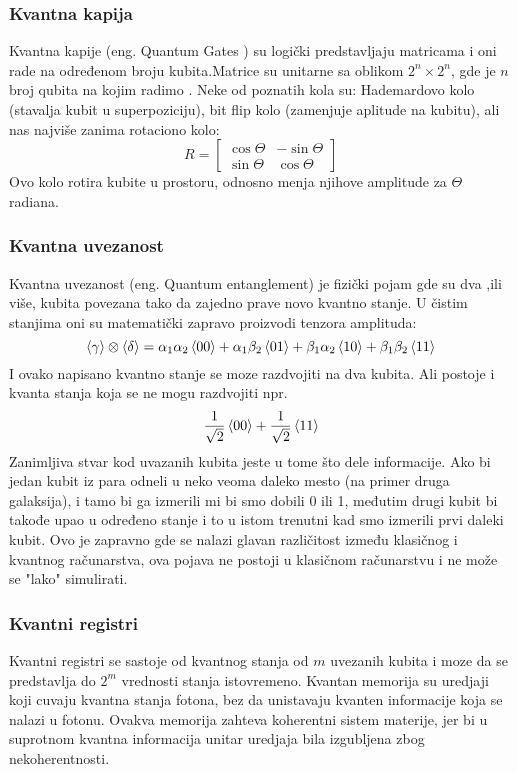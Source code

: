 \documentclass[12pt, letterpaper, oneside]{article}
\begin{document}
\subsubsection*{Kvantna kapija}
Kvantna kapije (eng. Quantum Gates ) su logički predstavljaju matricama i oni rade na određenom broju kubita.Matrice su unitarne sa oblikom $2^n \times 2^n$, gde je $n$ broj qubita na kojim radimo . Neke od poznatih kola su: Hademardovo kolo (stavalja kubit u superpoziciju), bit flip kolo (zamenjuje aplitude na kubitu), ali nas najviše zanima rotaciono kolo:
\[
    R = \begin{bmatrix}
        \cos{\Theta} & -\sin{\Theta} \\
        \sin{\Theta} & \cos{\Theta} 
    \end{bmatrix}
\]
Ovo kolo rotira kubite u prostoru, odnosno menja njihove amplitude za $\Theta$ radiana.
\subsubsection*{Kvantna uvezanost}
Kvantna uvezanost (eng. Quantum entanglement) je fizički pojam gde su dva ,ili više, kubita povezana tako da zajedno prave novo kvantno stanje.
U čistim stanjima oni su matematički zapravo proizvodi tenzora amplituda:
\[
    \braket{\gamma} \otimes \braket{\delta} = \alpha_1\alpha_2\braket{00} + \alpha_1\beta_2\braket{01} + \beta_1\alpha_2\braket{10} + \beta_1\beta_2\braket{11}
\]
I ovako napisano kvantno stanje se moze razdvojiti na dva kubita. Ali postoje i kvanta stanja koja se ne mogu razdvojiti npr.
\[
 \frac{1}{\sqrt{2}}\braket{00} + \frac{1}{\sqrt{2}}\braket{11}
\]
Zanimljiva stvar kod uvazanih kubita jeste u tome što dele informacije. Ako bi jedan kubit iz para odneli u neko veoma daleko mesto (na primer druga galaksija), i tamo bi ga izmerili mi bi smo dobili 0 ili 1, međutim drugi kubit bi takođe upao u određeno stanje i to u istom trenutni kad smo izmerili prvi daleki kubit. Ovo je zapravno gde se nalazi glavan različitost između klasičnog i kvantnog računarstva, ova pojava ne postoji u klasičnom računarstvu i ne može se "lako" simulirati.
\subsubsection*{Kvantni registri}
Kvantni registri se sastoje od kvantnog stanja od $m$ uvezanih kubita i moze da se predstavlja do $2^m$ vrednosti stanja istovremeno.
Kvantan memorija su uredjaji koji cuvaju kvantna stanja fotona, bez da unistavaju kvanten informacije koja se nalazi u fotonu.
Ovakva memorija zahteva koherentni sistem materije, jer bi u suprotnom kvantna informacija unitar uredjaja bila izgubljena zbog nekoherentnosti.
\end{document}
